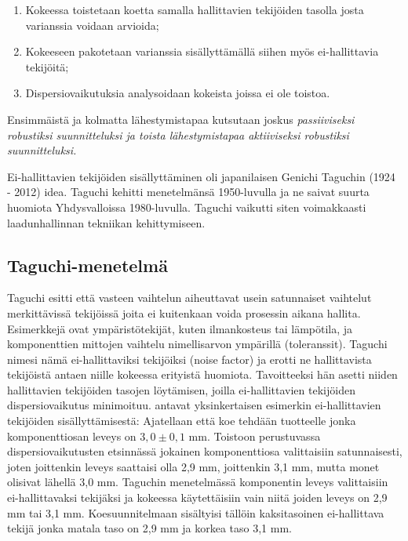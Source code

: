 \documentclass[12pt,a4paper,finnish]{tutthesis}
\begin{document}
\begin{enumerate}
\item  Kokeessa toistetaan koetta samalla hallittavien tekijöiden
    tasolla josta varianssia voidaan arvioida;
\item Kokeeseen pakotetaan varianssia sisällyttämällä siihen
    myös ei-hallittavia tekijöitä;
\item Dispersiovaikutuksia analysoidaan kokeista joissa ei
    ole toistoa. \parencite{Bursztyn}
\end{enumerate}

Ensimmäistä ja kolmatta lähestymistapaa kutsutaan joskus
\em passiiviseksi \em robustiksi suunnitteluksi ja toista lähestymistapaa
\em aktiiviseksi \em robustiksi suunnitteluksi.

Ei-hallittavien tekijöiden sisällyttäminen oli japanilaisen
Genichi Taguchin (1924 - 2012) idea. Taguchi kehitti menetelmänsä
1950-luvulla ja ne saivat suurta huomiota Yhdysvalloissa 1980-luvulla.
Taguchi vaikutti siten voimakkaasti laadunhallinnan tekniikan kehittymiseen.

\subsection{Taguchi-menetelmä}

Taguchi esitti että vasteen vaihtelun aiheuttavat usein satunnaiset vaihtelut
merkittävissä tekijöissä joita ei kuitenkaan voida prosessin aikana hallita.
Esimerkkejä ovat ympäristötekijät, kuten ilmankosteus tai lämpötila, ja
komponenttien mittojen vaihtelu nimellisarvon ympärillä (toleranssit).
Taguchi nimesi nämä ei-hallittaviksi tekijöiksi (noise factor)
ja erotti ne hallittavista tekijöistä antaen niille kokeessa erityistä
huomiota. Tavoitteeksi hän asetti niiden hallittavien tekijöiden tasojen
löytämisen, joilla ei-hallittavien tekijöiden dispersiovaikutus minimoituu.
\textcite{Bursztyn} antavat yksinkertaisen esimerkin ei-hallittavien tekijöiden
sisällyttämisestä: Ajatellaan että koe tehdään tuotteelle jonka
komponenttiosan leveys on \(3,0 \pm 0,1\) mm.
Toistoon perustuvassa dispersiovaikutusten etsinnässä jokainen
komponenttiosa valittaisiin satunnaisesti, joten joittenkin leveys
saattaisi olla 2,9 mm, joittenkin 3,1 mm, mutta monet olisivat lähellä
3,0 mm. Taguchin menetelmässä komponentin leveys valittaisiin
ei-hallittavaksi tekijäksi ja kokeessa käytettäisiin vain niitä joiden
leveys on 2,9 mm tai 3,1 mm. Koesuunnitelmaan sisältyisi tällöin
kaksitasoinen ei-hallittava tekijä jonka matala taso on 2,9 mm ja
korkea taso 3,1 mm.
\end{document}
